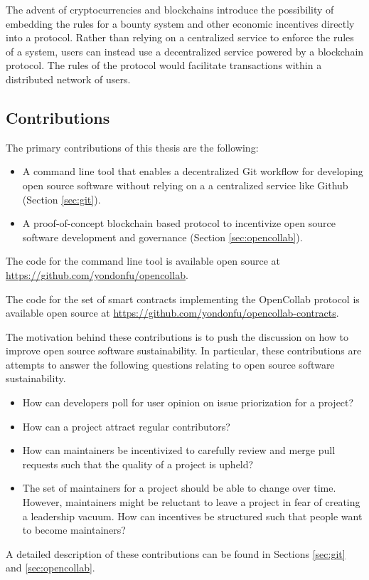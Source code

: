 The advent of cryptocurrencies and blockchains introduce the
possibility of embedding the rules for a bounty system and other economic
incentives directly into a protocol. Rather than relying on a centralized
service to enforce the rules of a system, users can instead use a decentralized
service powered by a blockchain protocol. The rules of the protocol would
facilitate transactions within a distributed network of users.

\subsection{Contributions}

The primary contributions of this thesis are the following:

\begin{itemize}
  \item A command line tool that enables a decentralized Git workflow for
    developing open source software without relying on a a centralized service
    like Github (Section \ref{sec:git}).
  \item A proof-of-concept blockchain based protocol to incentivize open source
    software development and governance (Section \ref{sec:opencollab}).
\end{itemize}

The code for the command line tool is available open source at \url{https://github.com/yondonfu/opencollab}.

The code for the set of smart contracts implementing the OpenCollab protocol is
available open source at \url{https://github.com/yondonfu/opencollab-contracts}.

The motivation behind these contributions is to push the discussion on how to
improve open source software sustainability. In particular, these contributions are
attempts to answer the following questions relating to open source software sustainability.

\begin{itemize}
  \item How can developers poll for user opinion on issue
    priorization for a project?
  \item How can a project attract regular contributors?
  \item How can maintainers be incentivized to carefully review and merge pull
    requests such that the quality of a project is upheld?
  \item The set of maintainers for a project should be able to change over time.
    However, maintainers might be reluctant to leave a project in fear of
    creating a leadership vacuum. How can incentives be structured such that
    people want to become maintainers?
\end{itemize}

A detailed description of these contributions can be found in Sections
\ref{sec:git} and \ref{sec:opencollab}.

